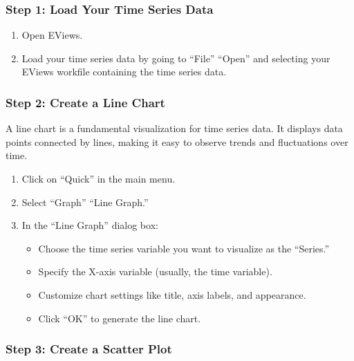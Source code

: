 \documentclass[
  letterpaper,
  DIV=11,
  numbers=noendperiod]{scrartcl}
\begin{document}
\hypertarget{step-1-load-your-time-series-data}{%
\subsubsection{\texorpdfstring{\textbf{Step 1: Load Your Time Series
Data}}{Step 1: Load Your Time Series Data}}\label{step-1-load-your-time-series-data}}

\begin{enumerate}
\def\labelenumi{\arabic{enumi}.}
\item
  Open EViews.
\item
  Load your time series data by going to ``File'' ``Open'' and selecting
  your EViews workfile containing the time series data.
\end{enumerate}

\hypertarget{step-2-create-a-line-chart}{%
\subsubsection{\texorpdfstring{\textbf{Step 2: Create a Line
Chart}}{Step 2: Create a Line Chart}}\label{step-2-create-a-line-chart}}

A line chart is a fundamental visualization for time series data. It
displays data points connected by lines, making it easy to observe
trends and fluctuations over time.

\begin{enumerate}
\def\labelenumi{\arabic{enumi}.}
\item
  Click on ``Quick'' in the main menu.
\item
  Select ``Graph'' ``Line Graph.''
\item
  In the ``Line Graph'' dialog box:

  \begin{itemize}
  \item
    Choose the time series variable you want to visualize as the
    ``Series.''
  \item
    Specify the X-axis variable (usually, the time variable).
  \item
    Customize chart settings like title, axis labels, and appearance.
  \item
    Click ``OK'' to generate the line chart.
  \end{itemize}
\end{enumerate}

\hypertarget{step-3-create-a-scatter-plot}{%
\subsubsection{\texorpdfstring{\textbf{Step 3: Create a Scatter
Plot}}{Step 3: Create a Scatter Plot}}\label{step-3-create-a-scatter-plot}}
\end{document}
